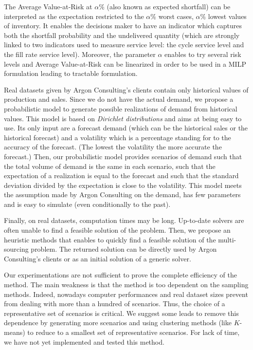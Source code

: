 The Average Value-at-Risk at $\alpha\%$ (also known as expected shortfall) can be interpreted as the expectation restricted to the $\alpha\%$ worst cases, \ie $\alpha\%$ lowest values of inventory.
It enables the decisions maker to have an indicator which captures both the shortfall probability and the undelivered quantity (which are strongly linked to two indicators used to measure service level: the cycle service level and the fill rate service level).
Moreover, the parameter $\alpha$ enables to try several risk levels and Average Value-at-Risk can be linearized in order to be used in a MILP formulation leading to tractable formulation.


\medskip


Real datasets given by Argon Consulting's clients contain only historical values of production and sales.
Since we do not have the actual demand, we propose a probabilistic model to generate possible realizations of demand from historical values.
This model is based on \emph{Dirichlet distributions} and aims at being easy to use.
Its only input are a forecast demand (which can be the historical sales or the historical forecast) and a volatility which is a percentage standing for to the accuracy of the forecast.
(The lowest the volatility the more accurate the forecast.)
Then, our probabilistic model provides scenarios of demand such that the total volume of demand is the same in each scenario, such that the expectation of a realization is equal to the forecast and such that the standard deviation divided by the expectation is close to the volatility.
This model meets the assumption made by Argon Consulting on the demand, has few parameters and is easy to simulate (even conditionally to the past).


\medskip


Finally, on real datasets, computation times may be long.
Up-to-date solvers are often unable to find a feasible solution of the problem.
Then, we propose an heuristic methods that enables to quickly find a feasible solution of the multi-sourcing problem.
The returned solution can be directly used by Argon Consulting's clients or as an initial solution of a generic solver.


\medskip


Our experimentations are not sufficient to prove the complete efficiency of the method.
The main weakness is that the method is too dependent on the sampling methods.
Indeed, nowadays computer performances and real dataset sizes prevent from dealing with more than a hundred of scenarios.
Thus, the choice of a representative set of scenarios is critical.
We suggest some leads to remove this dependence by generating more scenarios and using clustering methods (like $K$-means) to reduce to a smallest set of representative scenarios.
For lack of time, we have not yet implemented and tested this method.



